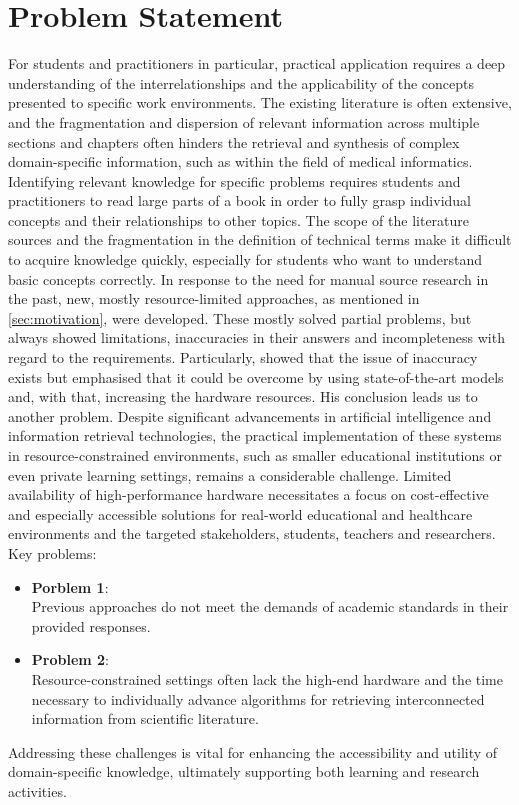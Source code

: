\section{Problem Statement}\label{sec:problem statement}
For students and practitioners in particular, practical application requires a deep understanding of the interrelationships and the applicability of the concepts presented to specific work environments.
The existing literature is often extensive, and the fragmentation and dispersion of relevant information across multiple sections and chapters often hinders the retrieval and synthesis of complex domain-specific information, such as within the field of medical informatics.
Identifying relevant knowledge for specific problems requires students and practitioners to read large parts of a book in order to fully grasp individual concepts and their relationships to other topics.
The scope of the literature sources and the fragmentation in the definition of technical terms make it difficult to acquire knowledge quickly, especially for students who want to understand basic concepts correctly.
%
In response to the need for manual source research in the past, new, mostly resource-limited approaches, as mentioned in \cref{sec:motivation}, were developed. 
These mostly solved partial problems, but always showed limitations, inaccuracies in their answers and incompleteness with regard to the requirements. 
%
Particularly, \citet{Paul_Keller} showed that the issue of inaccuracy exists but emphasised that it could be overcome by using state-of-the-art models and, with that, increasing the hardware resources. 
His conclusion leads us to another problem.   
Despite significant advancements in artificial intelligence and information retrieval technologies, the practical implementation of these systems in resource-constrained environments, such as smaller educational institutions or even private learning settings, remains a considerable challenge. 
Limited availability of high-performance hardware necessitates a focus on cost-effective and especially accessible solutions for real-world educational and healthcare environments and the targeted stakeholders, students, teachers and researchers.
%
Key problems:
\begin{itemize}
    \item \textbf{Porblem 1}:\\
    Previous approaches do not meet the demands of academic standards in their provided responses. 
    \item \textbf{Problem 2}:\\ 
    Resource-constrained settings often lack the high-end hardware and the time necessary to individually advance algorithms for retrieving interconnected information from scientific literature.
\end{itemize}
%
Addressing these challenges is vital for enhancing the accessibility and utility of domain-specific knowledge, ultimately supporting both learning and research activities. 


